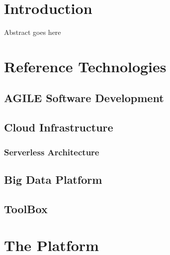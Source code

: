 \documentclass[11pt,a4paper,twoside,
openright]{book}
\begin{document}
\tableofcontents 

\chapter{Introduction}
Abstract goes here



\chapter{Reference Technologies}
\section{AGILE Software Development}
\section{Cloud Infrastructure}
\subsection{Serverless Architecture}
\section{Big Data Platform}
\section{ToolBox}


\chapter{The Platform}
\end{document}
